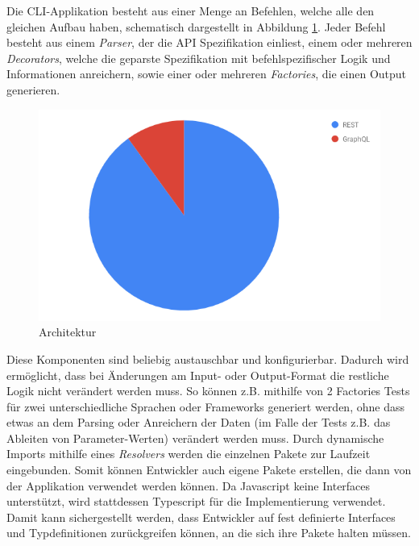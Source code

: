 Die CLI-Applikation besteht aus einer Menge an Befehlen, welche alle den gleichen Aufbau haben, schematisch dargestellt in Abbildung \ref{fig:architecture}. Jeder Befehl besteht aus einem \emph{Parser}, der die API Spezifikation einliest, einem oder mehreren \emph{Decorators}, welche die geparste Spezifikation mit befehlspezifischer Logik und Informationen anreichern, sowie einer oder mehreren \emph{Factories}, die einen Output generieren. \\

\begin{figure}[H]
\centering
  \includegraphics[width=\textwidth]{../images/architecture.png}
  \caption{Architektur}
  \label{fig:architecture}
\end{figure}

Diese Komponenten sind beliebig austauschbar und konfigurierbar. Dadurch wird ermöglicht, dass bei Änderungen am Input- oder Output-Format die restliche Logik nicht verändert werden muss. So können z.B. mithilfe von 2 Factories Tests für zwei unterschiedliche Sprachen oder Frameworks generiert werden, ohne dass etwas an dem Parsing oder Anreichern der Daten (im Falle der Tests z.B. das Ableiten von Parameter-Werten) verändert werden muss. Durch dynamische Imports mithilfe eines \emph{Resolvers} werden die einzelnen Pakete zur Laufzeit eingebunden. Somit können Entwickler auch eigene Pakete erstellen, die dann von der Applikation verwendet werden können. Da Javascript keine Interfaces unterstützt, wird stattdessen Typescript für die Implementierung verwendet. Damit kann sichergestellt werden, dass Entwickler auf fest definierte Interfaces und Typdefinitionen zurückgreifen können, an die sich ihre Pakete halten müssen. 




